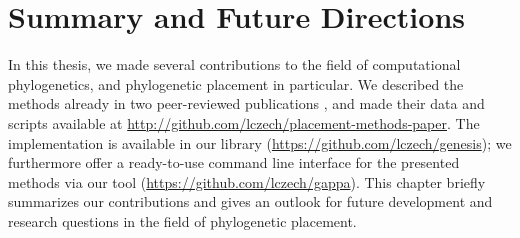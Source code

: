 
\chapter{Summary and Future Directions}
\label{ch:ConclusionOutlook}







In this thesis, we made several contributions to the field of computational phylogenetics,
and phylogenetic placement in particular.
We described the methods already in two peer-reviewed publications \cite{Czech2018,Czech2018a},
and made their data and scripts available at \url{http://github.com/lczech/placement-methods-paper}.
The implementation is available in our  library (\url{https://github.com/lczech/genesis});
we furthermore offer a ready-to-use command line interface for the presented methods
via our  tool (\url{https://github.com/lczech/gappa}).
This chapter briefly summarizes our contributions and gives an outlook for future development and research questions
in the field of phylogenetic placement.

